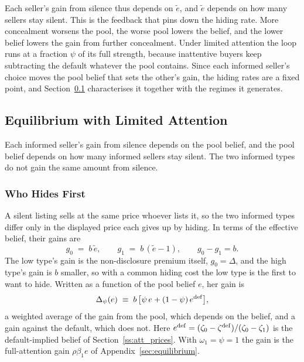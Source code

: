 Each seller's gain from silence thus depends on $\tilde e$, and $\tilde e$ depends on how many sellers stay silent. This is the feedback that pins down the hiding rate. More concealment worsens the pool, the worse pool lowers the belief, and the lower belief lowers the gain from further concealment. Under limited attention the loop runs at a fraction $\psi$ of its full strength, because inattentive buyers keep subtracting the default whatever the pool contains. Since each informed seller's choice moves the pool belief that sets the other's gain, the hiding rates are a fixed point, and Section~\ref{ss:att_equilibrium} characterises it together with the regimes it generates.

\subsection{Equilibrium with Limited Attention}
\label{ss:att_equilibrium}

Each informed seller's gain from silence depends on the pool belief, and the pool belief depends on how many informed sellers stay silent. The two informed types do not gain the same amount from silence.

\subsubsection{Who Hides First}
\label{ss:att_who}

A silent listing sells at the same price whoever lists it, so the two informed types differ only in the displayed price each gives up by hiding. In terms of the effective belief, their gains are
\begin{equation}
    g_0\;=\;b\,\tilde e,\qquad g_1\;=\;b\,(\tilde e-1),\qquad g_0-g_1=b.
    \label{eq:gains}
\end{equation}
The low type's gain is the non-disclosure premium itself, $g_0=\Delta$, and the high type's gain is $b$ smaller, so with a common hiding cost the low type is the first to want to hide. Written as a function of the pool belief $e$, her gain is
\begin{equation}
    \Delta_\psi(e)\;\equiv\;b\,\big[\psi\,e+(1-\psi)\,e^{\rm def}\big],
    \label{eq:Delta_psi}
\end{equation}
a weighted average of the gain from the pool, which depends on the belief, and a gain against the default, which does not. Here $e^{\rm def}=(\zeta_0-\zeta^{\rm def})/(\zeta_0-\zeta_1)$ is the default-implied belief of Section~\ref{ss:att_prices}. With $\omega_1=\psi=1$ the gain is the full-attention gain $\rho\beta_1 e$ of Appendix~\ref{sec:equilibrium}.

